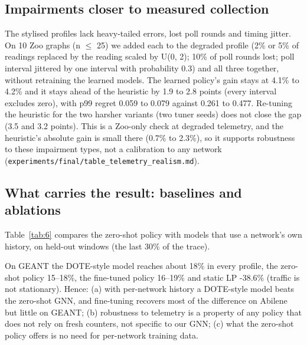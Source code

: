 \documentclass[journal]{IEEEtran}
\begin{document}
\subsection{Impairments closer to measured collection}
\label{sec:6.2c}
The stylised profiles lack heavy-tailed errors, lost poll rounds and timing jitter. On 10 Zoo graphs (n $\le$ 25) we added each to the degraded profile (2\% or 5\% of readings replaced by the reading scaled by U(0, 2); 10\% of poll rounds lost; poll interval jittered by one interval with probability 0.3) and all three together, without retraining the learned models. The learned policy's gain stays at 4.1\% to 4.2\% and it stays ahead of the heuristic by 1.9 to 2.8 points (every interval excludes zero), with p99 regret 0.059 to 0.079 against 0.261 to 0.477. Re-tuning the heuristic for the two harsher variants (two tuner seeds) does not close the gap (3.5 and 3.2 points). This is a Zoo-only check at degraded telemetry, and the heuristic's absolute gain is small there (0.7\% to 2.3\%), so it supports robustness to these impairment types, not a calibration to any network (\texttt{experiments/final/table\_telemetry\_realism.md}).

\subsection{What carries the result: baselines and ablations}
\label{sec:6.3}
Table~\ref{tab:6} compares the zero-shot policy with models that use a network's own history, on held-out windows (the last 30\% of the trace).

\begin{table}[!t]
\caption{Held-out gain (\%) on Abilene at load 0.8. The heuristic column is the single-run heuristic of Appendix~\ref{app:A}, not the re-tuned one.}
\label{tab:6}
\centering
\scriptsize
\renewcommand{\arraystretch}{1.05}
\end{table}

On GEANT the DOTE-style model reaches about 18\% in every profile, the zero-shot policy 15--18\%, the fine-tuned policy 16--19\% and static LP -38.6\% (traffic is not stationary). Hence: (a) with per-network history a DOTE-style model beats the zero-shot GNN, and fine-tuning recovers most of the difference on Abilene but little on GEANT; (b) robustness to telemetry is a property of any policy that does not rely on fresh counters, not specific to our GNN; (c) what the zero-shot policy offers is no need for per-network training data.
\end{document}
